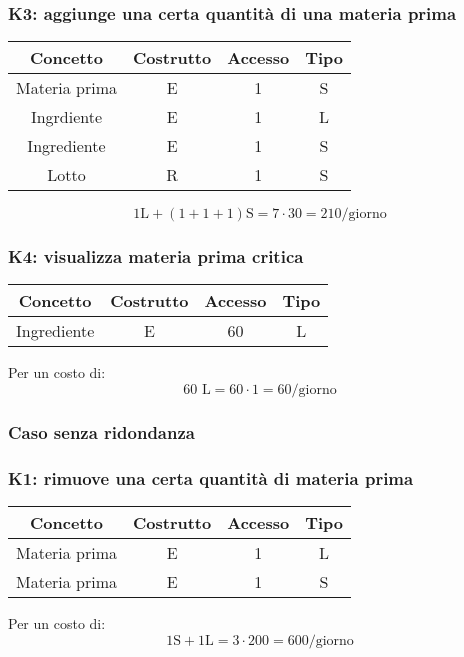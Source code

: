 \documentclass[a4paper,12pt]{report}
\begin{document}
\subsubsection{K3: aggiunge una certa quantità di una materia prima}
%
\begin{table}[H]
    \centering
    \begin{tabular}{|| c | c | c | c ||}
        \hline
        Concetto & Costrutto & Accesso & Tipo\\
        \hline
        Materia prima & E & 1 & S\\
        \hline
        Ingrdiente & E & 1 & L\\
        \hline
        Ingrediente & E & 1 & S\\
        \hline
        Lotto & R & 1 & S\\
        \hline
    \end{tabular}
\end{table}
%
\begin{equation}
    1\text{L} + (1+1+1)\text{S}= 7 \cdot 30 = 210\text{/giorno}
\end{equation}
%
\subsubsection{K4: visualizza materia prima critica}
\begin{table}[H]
    \centering
    \begin{tabular}{|| c | c | c | c ||}
        \hline
        Concetto & Costrutto & Accesso & Tipo\\
        \hline
        Ingrediente & E & 60 & L\\
        \hline
    \end{tabular}
\end{table}
Per un costo di: 
\begin{equation}
    60\text{ L} = 60 \cdot 1 = 60\text{/giorno}
\end{equation}
%
\subsubsection{Caso senza ridondanza}
%
\subsubsection{K1: rimuove una certa quantità di materia prima}
%
\begin{table}[H]
    \centering
    \begin{tabular}{|| c | c | c | c ||}
        \hline
        Concetto & Costrutto & Accesso & Tipo\\
        \hline
        Materia prima & E & 1 & L\\
        \hline
        Materia prima & E & 1 & S\\
        \hline
    \end{tabular}
\end{table}
Per un costo di: 
\begin{equation}
    1\text{S} + 1\text{L} = 3 \cdot 200 = 600 \text{/giorno}
\end{equation}
%
\end{document}
